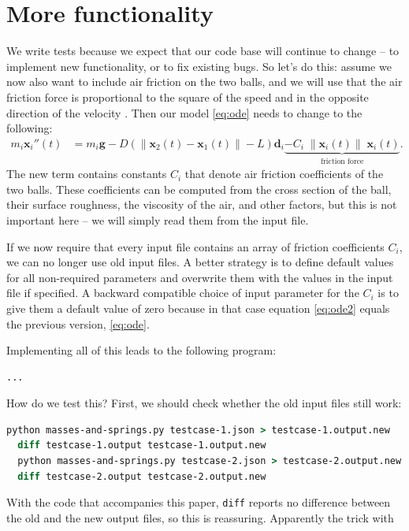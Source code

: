 \documentclass{article}
\begin{document}
\section{More functionality}

We write tests because we expect that our code base will continue to change --
to implement new functionality, or to fix existing bugs. So let's do this:
assume we now also want to include air friction on the two balls, and we will
use that the air friction force is proportional to the square of the speed and
in the opposite direction of the velocity \cite{...}. Then our model
\eqref{eq:ode} needs to change to the following:
\begin{align}
  \label{eq:ode2}
  m_i 
  \mathbf x_i''(t)
  &=
  m_i \mathbf g
  -
  D \left(\|\mathbf x_2(t) - \mathbf x_1(t)\| - L\right) \mathbf d_i
  \underbrace{-C_i \; \|\mathbf x_i(t)\| \; \mathbf x_i(t)}_{\text{friction force}}.
\end{align}
The new term contains constants $C_i$ that denote air friction coefficients of
the two balls. These coefficients can be computed from the cross section of
the ball, their surface roughness, the viscosity of the air, and other
factors, but this is not important here -- we will simply read them from the
input file.

If we now require that every input file contains an array of friction
coefficients $C_i$, we can no longer use old input files. A better strategy is
to define default values for all non-required parameters and overwrite them
with the values in the input file if specified. A backward compatible choice
of input parameter for the $C_i$ is to give them a default value of zero
because in that case equation \eqref{eq:ode2} equals the previous version,
\eqref{eq:ode}.

Implementing all of this leads to the following program:
\begin{lstlisting}[frame=single,basicstyle=\footnotesize]
  ...
\end{lstlisting}

How do we test this? First, we should check whether the old input files still
work:
\begin{lstlisting}[frame=single,basicstyle=\footnotesize,language=csh]
  python masses-and-springs.py testcase-1.json > testcase-1.output.new
  diff testcase-1.output testcase-1.output.new
  python masses-and-springs.py testcase-2.json > testcase-2.output.new
  diff testcase-2.output testcase-2.output.new
\end{lstlisting}
With the code that accompanies this paper, \texttt{diff} reports no difference
between the old and the new output files, so this is reassuring. Apparently
the trick with 
\end{document}
